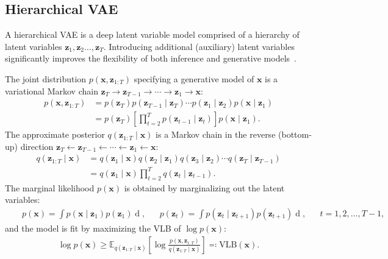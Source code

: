 \subsection{Hierarchical VAE}
\label{subsec: Hierarchical VAE}
A hierarchical VAE is a deep latent variable model comprised of a hierarchy of latent variables $\mathbf{z}_1,\mathbf{z}_2 \dots, \mathbf{z}_T$. Introducing additional (auxiliary) latent variables significantly improves the flexibility of both inference and generative models~\citep{salimans2015markov,ranganath2016hierarchical,maaloe2016auxiliary}.

The joint distribution $p(\mathbf{x}, \mathbf{z}_{1:T})$ specifying a generative model of $\mathbf{x}$ is a variational Markov chain \newline $\mathbf{z}_T \to \mathbf{z}_{T-1} \to \cdots \to \mathbf{z}_1 \to \mathbf{x}$:
%
\begin{align}
    p(\mathbf{x}, \mathbf{z}_{1:T}) &= p(\mathbf{z}_T)p(\mathbf{z}_{T-1} \mid \mathbf{z}_T) \cdots p(\mathbf{z}_1 \mid \mathbf{z}_2) p(\mathbf{x} \mid \mathbf{z}_1)
    \\[5pt] & 
    = p(\mathbf{z}_T) \left[\prod_{t=2}^{T}p(\mathbf{z}_{t-1} \mid \mathbf{z}_t)\right]p(\mathbf{x} \mid \mathbf{z}_1). \label{eq: hvae_gen}
\end{align}
%
The approximate posterior $q(\mathbf{z}_{1:T} \mid \mathbf{x})$ is a Markov chain in the reverse (bottom-up) direction \newline $\mathbf{z}_T \leftarrow \mathbf{z}_{T-1} \leftarrow \cdots \leftarrow \mathbf{z}_1 \leftarrow \mathbf{x}$:
%
\begin{align}
    q(\mathbf{z}_{1:T} \mid \mathbf{x}) &= q(\mathbf{z}_1 \mid \mathbf{x})q(\mathbf{z}_2 \mid \mathbf{z}_1)q(\mathbf{z}_3 \mid \mathbf{z}_2) \cdots q(\mathbf{z}_T \mid \mathbf{z}_{T-1})
    \\[5pt] & 
    = q(\mathbf{z}_1 \mid \mathbf{x}) \prod_{t=2}^{T}q(\mathbf{z}_{t} \mid \mathbf{z}_{t-1}). \label{eq: hvae_inf}
\end{align}
%
The marginal likelihood $p(\mathbf{x})$ is obtained by marginalizing out the latent variables:
%
\begin{align}
    && p(\mathbf{x}) 
    = \int p(\mathbf{x} \mid  \mathbf{z}_{1})p(\mathbf{z}_1) \mathop{\mathrm{d}\mathbf{z}_{1}},
    &&
    p(\mathbf{z}_t) 
    = \int p(\mathbf{z}_t \mid  \mathbf{z}_{t+1})p(\mathbf{z}_{t+1}) \mathop{\mathrm{d}\mathbf{z}_{t+1}},&&t = 1,2,\dots,T-1,&&
\end{align}
%
and the model is fit by maximizing the VLB of $\log p(\mathbf{x})$:
%
\begin{align}
    \log p(\mathbf{x}) \geq \mathbb{E}_{q(\mathbf{z}_{1:T} \mid \mathbf{x})} \left[ \log \frac{p(\mathbf{x}, \mathbf{z}_{1:T})}{q(\mathbf{z}_{1:T} \mid \mathbf{x})} \right] \eqqcolon \mathrm{VLB}(\mathbf{x}).
\end{align}
%
